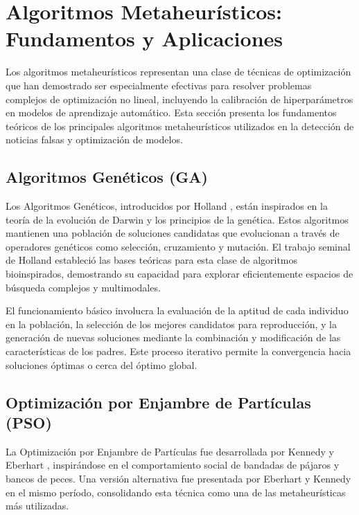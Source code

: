 \section{Algoritmos Metaheurísticos: Fundamentos y Aplicaciones}
\label{sec:algoritmos_metaheuristicos}

Los algoritmos metaheurísticos representan una clase de técnicas de optimización que han demostrado ser especialmente efectivas para resolver problemas complejos de optimización no lineal, incluyendo la calibración de hiperparámetros en modelos de aprendizaje automático. Esta sección presenta los fundamentos teóricos de los principales algoritmos metaheurísticos utilizados en la detección de noticias falsas y optimización de modelos.

\subsection{Algoritmos Genéticos (GA)}

Los Algoritmos Genéticos, introducidos por Holland \cite{holland1992adaptation}, están inspirados en la teoría de la evolución de Darwin y los principios de la genética. Estos algoritmos mantienen una población de soluciones candidatas que evolucionan a través de operadores genéticos como selección, cruzamiento y mutación. El trabajo seminal de Holland estableció las bases teóricas para esta clase de algoritmos bioinspirados, demostrando su capacidad para explorar eficientemente espacios de búsqueda complejos y multimodales.

El funcionamiento básico involucra la evaluación de la aptitud de cada individuo en la población, la selección de los mejores candidatos para reproducción, y la generación de nuevas soluciones mediante la combinación y modificación de las características de los padres. Este proceso iterativo permite la convergencia hacia soluciones óptimas o cerca del óptimo global.

\subsection{Optimización por Enjambre de Partículas (PSO)}

La Optimización por Enjambre de Partículas fue desarrollada por Kennedy y Eberhart \cite{kennedy1995particle}, inspirándose en el comportamiento social de bandadas de pájaros y bancos de peces. Una versión alternativa fue presentada por Eberhart y Kennedy \cite{eberhart1995particle} en el mismo período, consolidando esta técnica como una de las metaheurísticas más utilizadas.

